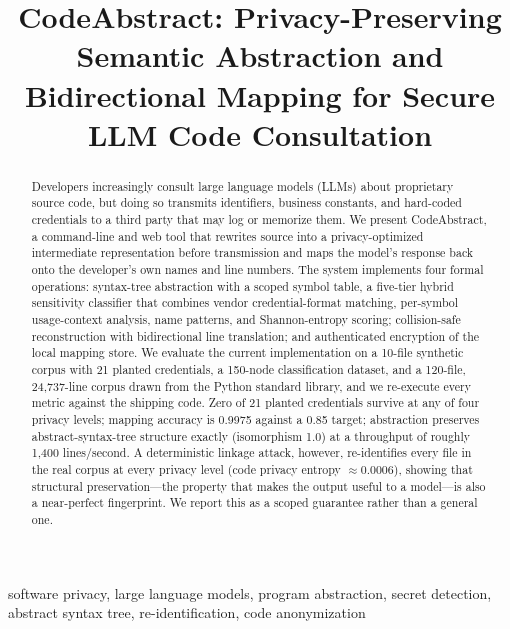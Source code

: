 \documentclass[conference]{IEEEtran}
\begin{document}
\title{CodeAbstract: Privacy-Preserving Semantic Abstraction and\\
Bidirectional Mapping for Secure LLM Code Consultation}

\author{
}

\maketitle

\begin{abstract}
Developers increasingly consult large language models (LLMs) about
proprietary source code, but doing so transmits identifiers, business
constants, and hard-coded credentials to a third party that may log or
memorize them. We present CodeAbstract, a command-line and web tool that
rewrites source into a privacy-optimized intermediate representation before
transmission and maps the model's response back onto the developer's own
names and line numbers. The system implements four formal operations:
syntax-tree abstraction with a scoped symbol table, a five-tier hybrid
sensitivity classifier that combines vendor credential-format matching,
per-symbol usage-context analysis, name patterns, and Shannon-entropy
scoring; collision-safe reconstruction with bidirectional line translation;
and authenticated encryption of the local mapping store. We evaluate the
current implementation on a 10-file synthetic corpus with 21 planted
credentials, a 150-node classification dataset, and a 120-file, 24{,}737-line
corpus drawn from the Python standard library, and we re-execute every
metric against the shipping code. Zero of 21 planted credentials survive at
any of four privacy levels; mapping accuracy is 0.9975 against a 0.85
target; abstraction preserves abstract-syntax-tree structure exactly
(isomorphism 1.0) at a throughput of roughly 1{,}400 lines/second. A
deterministic linkage attack, however, re-identifies every file in the
real corpus at every privacy level (code privacy entropy $\approx 0.0006$),
showing that structural preservation---the property that makes the output
useful to a model---is also a near-perfect fingerprint. We report this as a
scoped guarantee rather than a general one.
\end{abstract}

\begin{IEEEkeywords}
software privacy, large language models, program abstraction, secret
detection, abstract syntax tree, re-identification, code anonymization
\end{IEEEkeywords}
\end{document}
